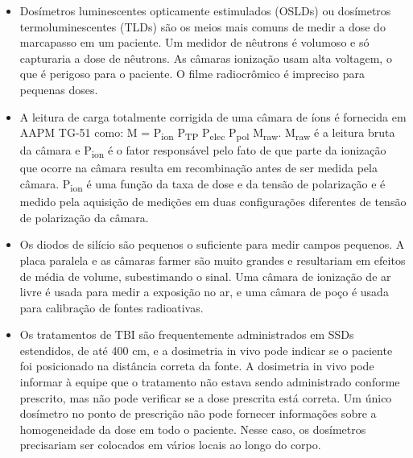 \documentclass[11pt,a4paper]{article}
\newcounter{exemplo}
\begin{document}
\begin{exemplo}[Dosimetria]
\begin{itemize}
        \item Dosímetros luminescentes opticamente estimulados (OSLDs) ou dosímetros termoluminescentes (TLDs) são os meios mais comuns de medir a dose do marcapasso em um paciente. Um medidor de nêutrons é volumoso e só capturaria a dose de nêutrons. As câmaras ionização usam alta voltagem, o que é perigoso para o paciente. O filme radiocrômico é impreciso para pequenas doses.
        
        \item A leitura de carga totalmente corrigida de uma câmara de íons é fornecida em AAPM TG-51 como: M = P\textsubscript{ion} P\textsubscript{TP} P\textsubscript{elec} P\textsubscript{pol} M\textsubscript{raw}. M\textsubscript{raw} é a leitura bruta da câmara e P\textsubscript{ion} é o fator responsável pelo fato de que parte da ionização que ocorre na câmara resulta em recombinação antes de ser medida pela câmara. P\textsubscript{ion} é uma função da taxa de dose e da tensão de polarização e é medido pela aquisição de medições em duas configurações diferentes de tensão de polarização da câmara.
        
        \item Os diodos de silício são pequenos o suficiente para medir campos pequenos. A placa paralela e as câmaras farmer são muito grandes e resultariam em efeitos de média de volume, subestimando o sinal. Uma câmara de ionização de ar livre é usada para medir a exposição no ar, e uma câmara de poço é usada para calibração de fontes radioativas.
        
        \item Os tratamentos de TBI são frequentemente administrados em SSDs estendidos, de até 400 cm, e a dosimetria in vivo pode indicar se o paciente foi posicionado na distância correta da fonte. A dosimetria in vivo pode informar à equipe que o tratamento não estava sendo administrado conforme prescrito, mas não pode verificar se a dose prescrita está correta. Um único dosímetro no ponto de prescrição não pode fornecer informações sobre a homogeneidade da dose em todo o paciente. Nesse caso, os dosímetros precisariam ser colocados em vários locais ao longo do corpo.
        
    \end{itemize}
\end{exemplo}
\end{document}
